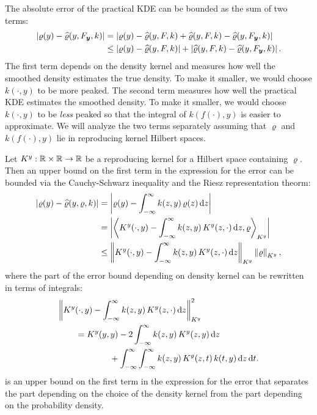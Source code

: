 \documentclass[letterpaper]{amsart}
\newcommand{\hvarrho}{\widehat{\varrho}}
\newcommand{\KY}{K^y}
\begin{document}
The absolute error of the practical KDE  can be bounded as the sum of two terms:
\begin{align*}
    \abs{\varrho(y) - \hvarrho(y,F_{\vy},k)} & =
     \abs{\varrho(y) - \hvarrho(y,F,k) + \hvarrho(y,F,k) - \hvarrho(y,F_{\vy},k)} \\
     & \le  \abs{\varrho(y) - \hvarrho(y,F,k)} + \abs{\hvarrho(y,F,k) - \hvarrho(y,F_{\vy},k)}.
\end{align*}
The first term depends on the density kernel and measures how well the smoothed density estimates the true density.  To make it smaller, we would choose $k(\cdot,y)$ to be more peaked.  The second term measures how well the practical KDE estimates the smoothed density.  To make it smaller, we would choose $k(\cdot,y)$ to be \emph{less} peaked so that the integral of $k(f(\cdot),y)$ is easier to approximate.
We will analyze the two terms separately assuming that $\varrho$ and $k(f(\cdot),y)$ lie in reproducing kernel Hilbert spaces.

Let $\KY:\reals \times \reals \to \reals$ be a reproducing kernel for a Hilbert space containing $\varrho$.  Then an upper bound on the first term in the expression for the error can be bounded via the Cauchy-Schwarz inequality and the Riesz representation theorm:
\begin{align}
\label{eq:firstbd}
\abs{\varrho(y) - \hvarrho(y,\varrho,k)}
& = \abs{\varrho(y) - \int_{-\infty}^{\infty} k(z,y) \, \varrho(z) \, \dif z} \\
\nonumber
& = \abs{\ip[\KY]{\KY(\cdot,y) - \int_{-\infty}^{\infty} k(z,y) \, \KY(z,\cdot) \,  \dif z}{\varrho} } \\
\nonumber
& \le  \norm[\KY]{\KY(\cdot,y) - \int_{-\infty}^{\infty} k(z,y) \, \KY(z,\cdot) \, \dif z} \norm[\KY]{\varrho},
\end{align}
where the part of the error bound depending on density kernel can be rewritten in terms of integrals:
\begin{align}
\label{eq:kquality}
\MoveEqLeft{\norm[\KY]{\KY(\cdot,y) - \int_{-\infty}^{\infty} k(z,y) \, \KY(z,\cdot) \, \dif z}^2} \\ \nonumber
&=  \KY(y,y) - 2 \int_{-\infty}^{\infty} k(z,y) \, \KY(z,y) \, \dif z \\ \nonumber
& \qquad \qquad + \int_{-\infty}^{\infty} \int_{-\infty}^{\infty}  k(z,y) \, \KY(z,t) \, k(t,y)\, \dif z \, \dif t.
\end{align}
 is an upper bound on the first term in the expression for the error that separates the part depending on the choice of the density kernel from the part depending on the probability density.
\end{document}
